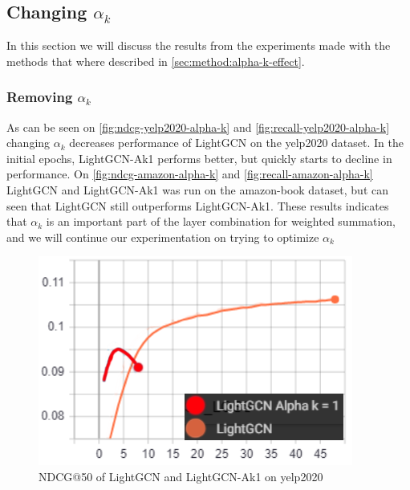 \subsection{Changing $\alpha_k$}
In this section we will discuss the results from the experiments made with the methods that where described in \autoref{sec:method:alpha-k-effect}.

\subsubsection{Removing $\alpha_k$}\label{subsubsec:remove-alpha-k}
As can be seen on \autoref{fig:ndcg-yelp2020-alpha-k} and \autoref{fig:recall-yelp2020-alpha-k} changing $\alpha_k$ decreases performance of LightGCN on the yelp2020 dataset.
In the initial epochs, LightGCN-Ak1 performs better, but quickly starts to decline in performance.
On \autoref{fig:ndcg-amazon-alpha-k} and \autoref{fig:recall-amazon-alpha-k} LightGCN and LightGCN-Ak1 was run on the amazon-book dataset, but can seen that LightGCN still outperforms LightGCN-Ak1.
These results indicates that $\alpha_k$ is an important part of the layer combination for weighted summation, and we will continue our experimentation on trying to optimize $\alpha_k$
\begin{figure}
    \includegraphics[width=\linewidth]{figures/alpha-k-results/yelp2020-ndcg.png}
    \caption{NDCG@50 of LightGCN and LightGCN-Ak1 on yelp2020}
    \label{fig:ndcg-yelp2020-alpha-k}
\end{figure}
